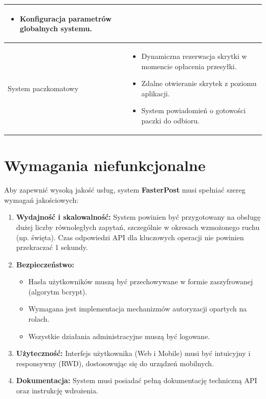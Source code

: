 \begin{tabularx}{\textwidth}{|l|>{\raggedright\arraybackslash}X|}
\begin{itemize}
    \item Konfiguracja parametrów globalnych systemu.
\end{itemize} \\ \hline
System paczkomatowy &
\begin{itemize}
    \item Dynamiczna rezerwacja skrytki w momencie opłacenia przesyłki.
    \item Zdalne otwieranie skrytek z poziomu aplikacji.
    \item System powiadomień o gotowości paczki do odbioru.
\end{itemize} \\ \hline
\end{tabularx}

\section{Wymagania niefunkcjonalne}

Aby zapewnić wysoką jakość usług, system \textbf{FasterPost} musi spełniać szereg wymagań jakościowych:

\begin{enumerate}
    \item \textbf{Wydajność i skalowalność:} System powinien być przygotowany na obsługę dużej liczby równoległych zapytań, szczególnie w okresach wzmożonego ruchu (np. święta). Czas odpowiedzi API dla kluczowych operacji nie powinien przekraczać 1 sekundy.
    \item \textbf{Bezpieczeństwo:}
    \begin{itemize}
        \item Hasła użytkowników muszą być przechowywane w formie zaszyfrowanej (algorytm bcrypt).
        \item Wymagana jest implementacja mechanizmów autoryzacji opartych na rolach.
        \item Wszystkie działania administracyjne muszą być logowane.
    \end{itemize}
    \item \textbf{Użyteczność:} Interfejs użytkownika (Web i Mobile) musi być intuicyjny i responsywny (RWD), dostosowując się do urządzeń mobilnych.
    \item \textbf{Dokumentacja:} System musi posiadać pełną dokumentację techniczną API oraz instrukcję wdrożenia.
\end{enumerate}
